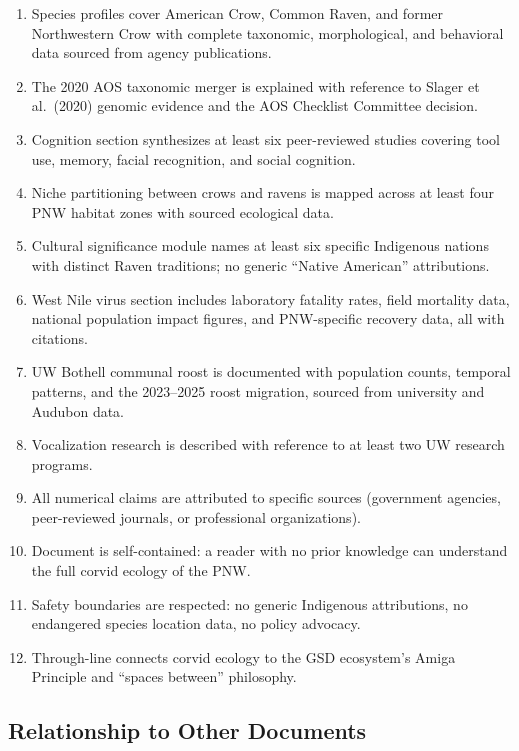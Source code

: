 \documentclass[11pt,letterpaper]{article}
\begin{document}
\begin{enumerate}[leftmargin=2em]
  \item Species profiles cover American Crow, Common Raven, and former Northwestern Crow with complete taxonomic, morphological, and behavioral data sourced from agency publications.
  \item The 2020 AOS taxonomic merger is explained with reference to Slager et al.\ (2020) genomic evidence and the AOS Checklist Committee decision.
  \item Cognition section synthesizes at least six peer-reviewed studies covering tool use, memory, facial recognition, and social cognition.
  \item Niche partitioning between crows and ravens is mapped across at least four PNW habitat zones with sourced ecological data.
  \item Cultural significance module names at least six specific Indigenous nations with distinct Raven traditions; no generic ``Native American'' attributions.
  \item West Nile virus section includes laboratory fatality rates, field mortality data, national population impact figures, and PNW-specific recovery data, all with citations.
  \item UW Bothell communal roost is documented with population counts, temporal patterns, and the 2023--2025 roost migration, sourced from university and Audubon data.
  \item Vocalization research is described with reference to at least two UW research programs.
  \item All numerical claims are attributed to specific sources (government agencies, peer-reviewed journals, or professional organizations).
  \item Document is self-contained: a reader with no prior knowledge can understand the full corvid ecology of the PNW.
  \item Safety boundaries are respected: no generic Indigenous attributions, no endangered species location data, no policy advocacy.
  \item Through-line connects corvid ecology to the GSD ecosystem's Amiga Principle and ``spaces between'' philosophy.
\end{enumerate}

\subsection{Relationship to Other Documents}
\end{document}
